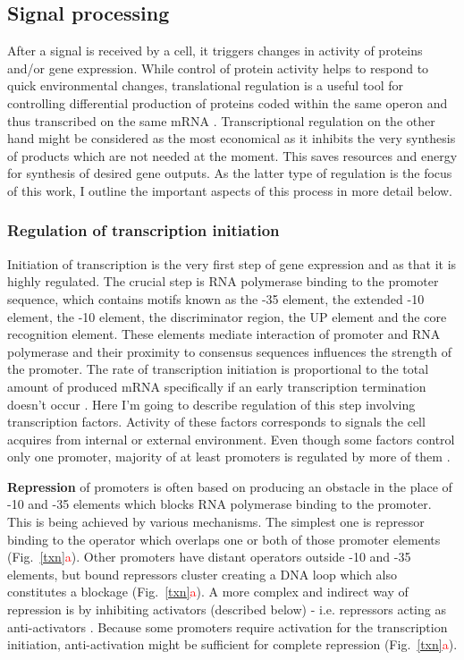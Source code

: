 \subsection{Signal processing}
After a signal is received by a cell, it triggers changes in activity of proteins and/or gene expression.
While control of protein activity helps to respond to quick environmental changes, translational regulation is a useful tool for controlling differential production of proteins coded within the same operon and thus transcribed on the same mRNA \cite{dar2018extensive}.
Transcriptional regulation on the other hand might be considered as the most economical as it inhibits the very synthesis of products which are not needed at the moment.
This saves resources and energy for synthesis of desired gene outputs.
As the latter type of regulation is the focus of this work, I outline the important aspects of this process in more detail below.

\subsubsection{Regulation of transcription initiation}
Initiation of transcription is the very first step of gene expression and as that it is highly regulated.
The crucial step is RNA polymerase binding to the promoter sequence, which contains motifs known as the -35 element, the extended -10 element, the -10 element, the
discriminator region, the UP element and the core recognition element.
These elements mediate interaction of promoter and RNA polymerase and their proximity to consensus sequences influences the strength of the promoter.
The rate of transcription initiation is proportional to the total amount of produced mRNA specifically if an early transcription termination doesn't occur \cite{kennell1977transcription, iyer1996absolute}.
Here I'm going to describe regulation of this step involving transcription factors.
Activity of these factors corresponds to signals the cell acquires from internal or external environment.
Even though some factors control only one promoter, majority of at least  promoters is regulated by more of them \cite{karp2014ecocyc}.

\textbf{Repression} of promoters is often based on producing an obstacle in the place of -10 and -35 elements which blocks RNA polymerase binding to the promoter.
This is being achieved by various mechanisms.
The simplest one is repressor binding to the operator which overlaps one or both of those promoter elements \cite{brent1981mechanism} (Fig.~\ref{txn}\textcolor{red}{a}).
Other promoters have distant operators outside -10 and -35 elements, but bound repressors cluster creating a DNA loop which also constitutes a blockage \cite{semsey2004dna} (Fig.~\ref{txn}\textcolor{red}{a}).
A more complex and indirect way of repression is by inhibiting activators (described below) - i.e. repressors acting as anti-activators \cite{sogaard1993protein}.
Because some promoters require activation for the transcription initiation, anti-activation might be sufficient for complete repression (Fig.~\ref{txn}\textcolor{red}{a}).

